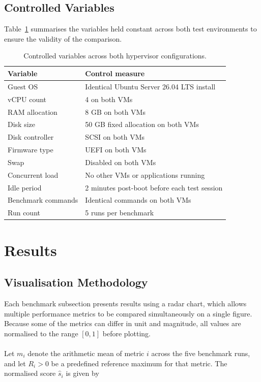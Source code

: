 \documentclass[a4paper, 12pt]{article}
\theoremstyle{plain}
\theoremstyle{definition}
\theoremstyle{remark}
\begin{document}
    \subsection{Controlled Variables}

    Table~\ref{tab:controls} summarises the variables held constant across both
    test environments to ensure the validity of the comparison.

    \begin{table}[H]
    \centering
    \caption{Controlled variables across both hypervisor configurations.}
    \label{tab:controls}
    \begin{tabular}{ll}
    \hline
    \textbf{Variable} & \textbf{Control measure} \\
    \hline
    Guest OS            & Identical Ubuntu Server 26.04 LTS install \\
    vCPU count          & 4 on both VMs \\
    RAM allocation      & 8 GB on both VMs \\
    Disk size           & 50 GB fixed allocation on both VMs \\
    Disk controller     & SCSI on both VMs \\
    Firmware type       & UEFI on both VMs \\
    Swap               & Disabled on both VMs \\
    Concurrent load     & No other VMs or applications running \\
    Idle period         & 2 minutes post-boot before each test session \\
    Benchmark commands  & Identical commands on both VMs \\
    Run count           & 5 runs per benchmark\\
    \hline
    \end{tabular}
    \end{table}
    \section{Results}

    \subsection{Visualisation Methodology}

    Each benchmark subsection presents results using a radar chart, which allows
    multiple performance metrics to be compared simultaneously on a single figure. 
    Because some of the metrics can differ in unit and magnitude, all values are
    normalised to the range $[0, 1]$ before plotting.\\
    \\
    \noindent Let $m_i$ denote the arithmetic mean of metric $i$ across the five benchmark
    runs, and let $R_i > 0$ be a predefined reference maximum for that metric.
    The normalised score $\hat{s}_i$ is given by
\end{document}
